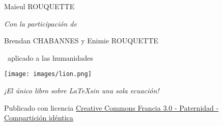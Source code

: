 \newpage\begin{center}
\parindent=0pt

{\Large Maïeul ROUQUETTE}
\vspace{0.5ex}

{\footnotesize \emph{Con la participación de}}

\vspace{0.5ex}

{Brendan CHABANNES y Enimie ROUQUETTE}

\vspace{8ex}
{\LARGE\logo~aplicado a las humanidades}

\vspace{10ex}
\texttt{[image: images/lion.png]}
\vspace{3ex}

{\large \emph{¡El único libro sobre \LaTeX sin una sola ecuación!}}

\vspace{28ex}



{\small Publicado con licencia \href{http://creativecommons.org/licenses/by-sa/3.0/fr/}{Creative Commons Francia 3.0 - Paternidad - Compartición idéntica}}
\end{center}
\newpage
